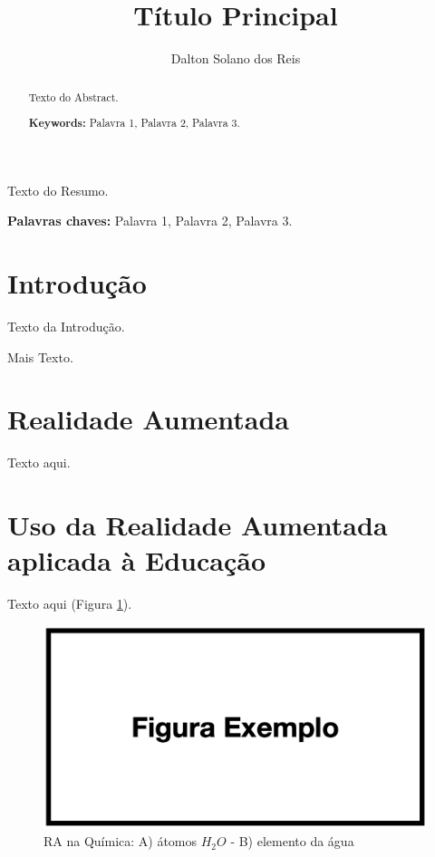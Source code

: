 \documentclass[12pt]{article}
\title{Título Principal}
\author{Dalton Solano dos Reis\inst{1}}
\begin{document}
 


\maketitle

\begin{abstract}
Texto do Abstract.

\textbf{Keywords:} Palavra 1, Palavra 2, Palavra 3.
\end{abstract}
     
\begin{resumo} 
Texto do Resumo.

\textbf{Palavras chaves:} Palavra 1, Palavra 2, Palavra 3.
\end{resumo}

\section{Introdução} \label{sec:introducao}

Texto da Introdução. 

Mais Texto.

\section{Realidade Aumentada} \label{sec:aumentada}

Texto aqui.  

\section{Uso da Realidade Aumentada aplicada à Educação}\label{sec:aplicada}

Texto aqui (Figura \ref{fig:Fig_Cavalli2024}).

\begin{figure}[ht]
\centering
\includegraphics[width=.99\textwidth]{figura.png}
\caption{RA na Química: A) átomos $H_2O$ - B) elemento da água}
\label{fig:Fig_Cavalli2024}
\end{figure}
\end{document}
